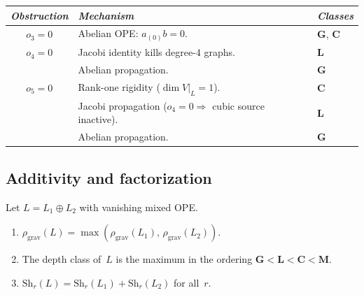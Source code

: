 \begin{theorem}
\ClaimStatusProvedHere
{}
\begin{center}
\small
\renewcommand{\arraystretch}{1.25}
\begin{tabular}{cll}
\toprule
\emph{Obstruction} & \emph{Mechanism} & \emph{Classes} \\
\midrule
$o_3 = 0$ &
 Abelian OPE: $a_{(0)}b = 0$. &
 $\mathbf{G}$, $\mathbf{C}$ \\
$o_4 = 0$ &
 Jacobi identity kills degree-$4$ graphs. &
 $\mathbf{L}$ \\
 & Abelian propagation. &
 $\mathbf{G}$ \\
$o_5 = 0$ &
 Rank-one rigidity ($\dim V|_L = 1$). &
 $\mathbf{C}$ \\
 & Jacobi propagation ($o_4 = 0 \Rightarrow$
 cubic source inactive). &
 $\mathbf{L}$ \\
 & Abelian propagation. &
 $\mathbf{G}$ \\
\bottomrule
\end{tabular}
\end{center}
\end{theorem}



\subsection{Additivity and factorization}

\begin{theorem}
\ClaimStatusProvedHere
{}
Let $L = L_1 \oplus L_2$ with vanishing mixed OPE.
\begin{enumerate}[label=\textup{(\roman*)}]
\item $\rho_{\mathrm{grav}}(L)
 = \max(\rho_{\mathrm{grav}}(L_1),\,
 \rho_{\mathrm{grav}}(L_2))$.
\item The depth class of~$L$ is the maximum in the ordering
 $\mathbf{G} < \mathbf{L} < \mathbf{C} < \mathbf{M}$.
\item $\mathrm{Sh}_r(L) = \mathrm{Sh}_r(L_1) +
 \mathrm{Sh}_r(L_2)$ for all~$r$.
\end{enumerate}
\end{theorem}

